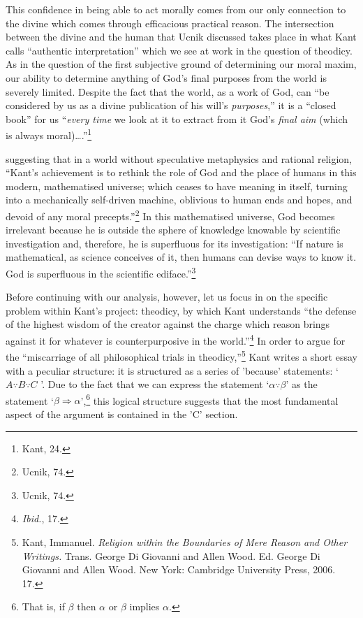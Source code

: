 \documentclass[12pt]{article}
\begin{document}
	This confidence in being able to act morally comes from our only connection to the divine which comes through efficacious practical reason. The intersection between the divine and the human that Ucnik discussed takes place in what Kant calls ``authentic interpretation'' which we see at work in the question of theodicy. As in the question of the first subjective ground of determining our moral maxim, our ability to determine anything of God's final purposes from the world is severely limited. Despite the fact that the world, as a work of God, can ``be considered by us as a divine publication of his will's \emph{purposes},'' it is a ``closed book'' for us ``\emph{every time} we look at it to extract from it God's \emph{final aim} (which is always moral)\ldots.''\footnote{Kant, 24.}













 suggesting that in a world without speculative metaphysics and rational religion, ``Kant's achievement is to rethink the role of God and the place of humans in this modern, mathematised universe; which ceases to have meaning in itself, turning into a mechanically self-driven machine, oblivious to human ends and  hopes, and devoid of any moral precepts.''\footnote{Ucnik, 74.} In this mathematised universe, God becomes irrelevant because he is outside the sphere of knowledge knowable by scientific investigation and, therefore, he is superfluous for its investigation: ``If nature is mathematical, as science conceives of it, then humans can devise ways to know it. God is superfluous in the scientific ediface.''\footnote{Ucnik, 74.}


  





Before continuing with our analysis, however, let us focus in on the specific problem within Kant's project: theodicy, by which Kant understands ``the defense of the highest wisdom of the creator against the charge which reason brings against it for whatever is counterpurposive in the world.''\footnote{\emph{Ibid.}, 17.} In order to argue for the ``miscarriage of all philosophical trials in theodicy,''\footnote{Kant, Immanuel. \emph{Religion within the Boundaries of Mere Reason and Other Writings.} Trans. George Di Giovanni and Allen Wood. Ed. George Di Giovanni and Allen Wood. New York: Cambridge University Press, 2006. 17.} Kant writes a short essay with a peculiar structure: it is structured as a series of 'because' statements: `$ A \because   B\because C$ '. Due to the fact that we can express the statement `$ \alpha \because \beta $'  as the statement `$\beta \Rightarrow \alpha $',\footnote{That is, if $\beta$ then $\alpha$ or $\beta$ implies $\alpha$.} this logical structure suggests that the most fundamental aspect of the argument is contained in the 'C' section. 
\end{document}
